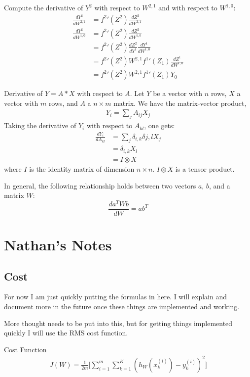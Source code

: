 \documentclass{article}
\begin{document}
Compute the derivative of $Y^2$ with respect to $W^{2,1}$ and with respect to $W^{1,0}$: 
\begin{align}
\frac{dY^2}{dW^{2,1}} &= {f^2}'(Z^2) \frac{dZ^2}{dW^{2,1}} \\
\frac{dY^2}{dW^{1,0}} &= {f^2}'(Z^2) \frac{dZ^2}{dW^{1,0}} \\
                      &= {f^2}'(Z^2) \frac{dZ^2}{dY^{1}} \frac{dY^{1}}{dW^{1,0}} \\
                      &= {f^2}'(Z^2) W^{2,1} {f^1}'(Z_1)\frac{dZ^1}{dW^{1,0}} \\     %
                      &= {f^2}'(Z^2) W^{2,1} {f^1}'(Z_1) Y_0     
\end{align}

Derivative of $Y=A*X$ with respect to $A$. Let $Y$ be a vector with $n$ rows, $X$ a vector with $m$ rows, and $A$ a $n\times m$ matrix. 
We have the matrix-vector product, 
\begin{align}
Y_i = \sum_j A_{ij} X_j
\end{align}
Taking the derivative of $Y_i$ with respect to $A_{kl}$, one gets: 
\begin{align}
\frac{dY_i}{dA_{kl}} &= \sum_j \delta_{i,k}\delta{j,l} X_j \\
                     &=   \delta_{i,k} X_l \\
                     &=   I \otimes X 
\end{align}
where $I$ is the identity matrix of dimension $n\times n$. $I\otimes X$ is a tensor product. 

In general, the following relationship holds between two vectors $a$, $b$, and a matrix $W$: 
$$
\frac{da^TWb}{dW} = a b^T
$$

\section{Nathan's Notes}

\subsection{Cost}
For now I am just quickly putting the formulas in here. I will explain and document more in the future once these things are implemented and working.

More thought needs to be put into this, but for getting things implemented quickly I will use the RMS cost function.

Cost Function
\begin{align}
J(W) = \frac{1}{2m} \bigg [\sum_{i=1}^m \sum_{k=1}^K (h_W(x_k^{(i)}) -y_k^{(i)})^2 \bigg ]
\end{align}
\end{document}
